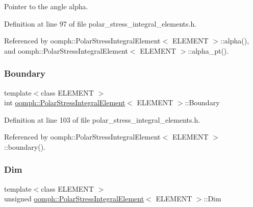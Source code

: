 Pointer to the angle alpha. 



Definition at line 97 of file polar\+\_\+stress\+\_\+integral\+\_\+elements.\+h.



Referenced by oomph\+::\+Polar\+Stress\+Integral\+Element$<$ E\+L\+E\+M\+E\+N\+T $>$\+::alpha(), and oomph\+::\+Polar\+Stress\+Integral\+Element$<$ E\+L\+E\+M\+E\+N\+T $>$\+::alpha\+\_\+pt().

\mbox{\label{classoomph_1_1PolarStressIntegralElement_a76f229a58be2858c8c61200a470f410f}} 
\subsubsection{\texorpdfstring{Boundary}{Boundary}}
{\footnotesize\ttfamily template$<$class E\+L\+E\+M\+E\+NT $>$ \\
int \hyperlink{classoomph_1_1PolarStressIntegralElement}{oomph\+::\+Polar\+Stress\+Integral\+Element}$<$ E\+L\+E\+M\+E\+NT $>$\+::Boundary\hspace{0.3cm}{\ttfamily [protected]}}



Definition at line 103 of file polar\+\_\+stress\+\_\+integral\+\_\+elements.\+h.



Referenced by oomph\+::\+Polar\+Stress\+Integral\+Element$<$ E\+L\+E\+M\+E\+N\+T $>$\+::boundary().

\mbox{\label{classoomph_1_1PolarStressIntegralElement_ae38e4f55fe5517c9a4e7480456b99e46}} 
\subsubsection{\texorpdfstring{Dim}{Dim}}
{\footnotesize\ttfamily template$<$class E\+L\+E\+M\+E\+NT $>$ \\
unsigned \hyperlink{classoomph_1_1PolarStressIntegralElement}{oomph\+::\+Polar\+Stress\+Integral\+Element}$<$ E\+L\+E\+M\+E\+NT $>$\+::Dim\hspace{0.3cm}{\ttfamily [private]}}



